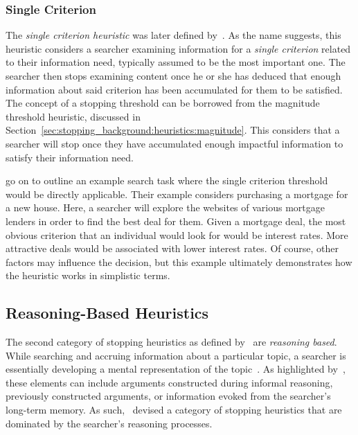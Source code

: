 \subsubsection{Single Criterion}\label{sec:stopping_background:heuristics:single}
The \emph{single criterion heuristic} was later defined by~\cite{browne2005stopping_rules}. As the name suggests, this heuristic considers a searcher examining information for a \emph{single criterion} related to their information need, typically assumed to be the most important one. The searcher then stops examining content once he or she has deduced that enough information about said criterion has been accumulated for them to be satisfied. The concept of a stopping threshold can be borrowed from the magnitude threshold heuristic, discussed in Section~\ref{sec:stopping_background:heuristics:magnitude}. This considers that a searcher will stop once they have accumulated enough impactful information to satisfy their information need.

\cite{browne2005stopping_rules} go on to outline an example search task where the single criterion threshold would be directly applicable. Their example considers purchasing a mortgage for a new house. Here, a searcher will explore the websites of various mortgage lenders in order to find the best deal for them. Given a mortgage deal, the most obvious criterion that an individual would look for would be interest rates. More attractive deals would be associated with lower interest rates. Of course, other factors may influence the decision, but this example ultimately demonstrates how the heuristic works in simplistic terms.

\subsection{Reasoning-Based Heuristics}\label{sec:stopping_background:heuristics:reasoning}
The second category of stopping heuristics as defined by~\cite{nickles1995judgment} are \emph{reasoning based}. While searching and accruing information about a particular topic, a searcher is essentially developing a mental representation of the topic~\citep{yates1990decision_making}. As highlighted by~\cite{nickles1995judgment}, these elements can include arguments constructed during informal reasoning, previously constructed arguments, or information evoked from the searcher's long-term memory. As such,~\cite{nickles1995judgment} devised a category of stopping heuristics that are dominated by the searcher's reasoning processes.

